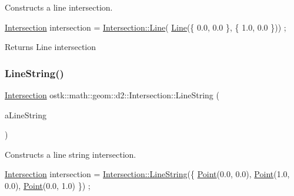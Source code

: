 Constructs a line intersection. 


\begin{DoxyCode}
\hyperlink{classostk_1_1math_1_1geom_1_1d2_1_1_intersection_a52e7ba577832b73a1eb5c95eaddf2834}{Intersection} intersection = \hyperlink{classostk_1_1math_1_1geom_1_1d2_1_1_intersection_a536bc73bc0e02fecc86c6f31d7bf77e0}{Intersection::Line}(
      \hyperlink{classostk_1_1math_1_1geom_1_1d2_1_1_intersection_a536bc73bc0e02fecc86c6f31d7bf77e0}{Line}(\{ 0.0, 0.0 \}, \{ 1.0, 0.0 \})) ;
\end{DoxyCode}


\begin{DoxyReturn}{Returns}
Line intersection 
\end{DoxyReturn}
\mbox{\label{classostk_1_1math_1_1geom_1_1d2_1_1_intersection_af5afb91ee23bb6a254bf1f805820d5d7}} 
\subsubsection{\texorpdfstring{Line\+String()}{LineString()}}
{\footnotesize\ttfamily \hyperlink{classostk_1_1math_1_1geom_1_1d2_1_1_intersection}{Intersection} ostk\+::math\+::geom\+::d2\+::\+Intersection\+::\+Line\+String (\begin{DoxyParamCaption}\item[{const \hyperlink{classostk_1_1math_1_1geom_1_1d2_1_1objects_1_1_line_string}{objects\+::\+Line\+String} \&}]{a\+Line\+String }\end{DoxyParamCaption})\hspace{0.3cm}{\ttfamily [static]}}



Constructs a line string intersection. 


\begin{DoxyCode}
\hyperlink{classostk_1_1math_1_1geom_1_1d2_1_1_intersection_a52e7ba577832b73a1eb5c95eaddf2834}{Intersection} intersection = \hyperlink{classostk_1_1math_1_1geom_1_1d2_1_1_intersection_af5afb91ee23bb6a254bf1f805820d5d7}{Intersection::LineString}(\{ 
      \hyperlink{classostk_1_1math_1_1geom_1_1d2_1_1_intersection_a26cc1aec3f2576ec97f0cd54aea9d935}{Point}(0.0, 0.0), \hyperlink{classostk_1_1math_1_1geom_1_1d2_1_1_intersection_a26cc1aec3f2576ec97f0cd54aea9d935}{Point}(1.0, 0.0), \hyperlink{classostk_1_1math_1_1geom_1_1d2_1_1_intersection_a26cc1aec3f2576ec97f0cd54aea9d935}{Point}(0.0, 1.0) \}) ;
\end{DoxyCode}


